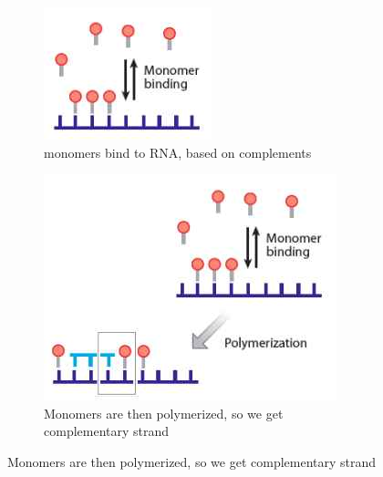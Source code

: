 \documentclass[]{article}
\begin{document}
\begin{figure}[H]
	\caption[Nonenzymatic RNA Polymerization]{Nonenzymatic RNA Polymerization\cite{blain2014progress}}\label{fig:NonenzymaticRNA_Polymerization}
	\begin{subfigure}[m]{0.45\textwidth}
		\caption{monomers bind to RNA, based on complements}\label{fig:MonomerBinding}
		\includegraphics[width=\textwidth]{MonomerBinding}
	\end{subfigure}
	\begin{subfigure}[m]{0.45\textwidth}
		\caption{Monomers are then polymerized, so we get complementary strand}\label{fig:RNA_polymerization_somehow}
		\includegraphics[width=\textwidth]{RNA_polymerization_somehow}

\end{subfigure}
\end{figure}
\end{document}
